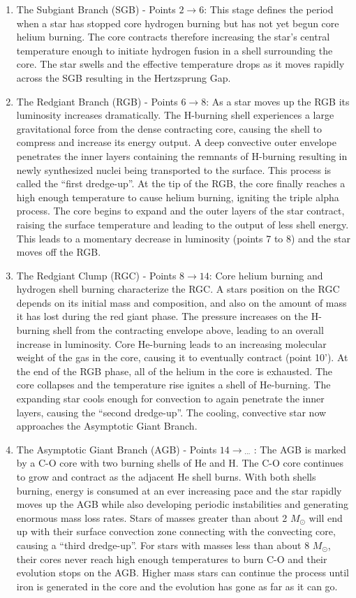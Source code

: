 \begin{enumerate}
%
\item The Subgiant Branch (SGB) - Points $2 \rightarrow 6$: This stage defines the period when a star has stopped core hydrogen burning but has not yet begun core helium burning. The core contracts therefore increasing the star's central temperature enough to initiate hydrogen fusion in a shell surrounding the core. The star swells and the effective temperature drops as it moves rapidly across the SGB resulting in the Hertzsprung Gap.
%
\item The Redgiant Branch (RGB) - Points $6 \rightarrow 8$: As a star moves up the RGB its luminosity increases dramatically. The H-burning shell experiences a large gravitational force from the dense contracting core, causing the shell to compress and increase its energy output. A deep convective outer envelope penetrates the inner layers containing the remnants of H-burning resulting in newly synthesized nuclei being transported to the surface. This process is called the ``first dredge-up''. At the tip of the RGB, the core finally reaches a high enough temperature to cause helium burning, igniting the triple alpha process. The core begins to expand and the outer layers of the star contract, raising the surface temperature and leading to the output of less shell energy. This leads to a momentary decrease in luminosity (points 7 to 8) and the star moves off the RGB.
%
\item The Redgiant Clump (RGC) - Points $8 \rightarrow 14$: Core helium burning and hydrogen shell burning characterize the RGC. A stars position on the RGC depends on its initial mass and composition, and  also on the amount of mass it has lost during the red giant phase. The pressure increases on the H-burning shell from the contracting envelope above, leading to an overall increase in luminosity. Core He-burning leads to an increasing molecular weight of the gas in the core, causing it to eventually contract (point 10'). At the end of the RGB phase, all of the helium in the core is exhausted. The core collapses and the temperature rise ignites a shell of He-burning. The expanding star cools enough for convection to again penetrate the inner layers, causing the ``second dredge-up''. The cooling, convective star  now approaches the Asymptotic Giant Branch.
%
\item The Asymptotic Giant Branch  (AGB) - Points $14 \rightarrow {}_{\cdots}$ : The AGB is marked by a C-O core with two burning shells of He and H. The C-O core continues to grow and contract as the adjacent He shell burns. With both shells burning, energy is consumed at an ever increasing pace and the star rapidly moves up the AGB while also developing periodic instabilities and generating enormous mass loss rates. Stars of masses greater than about 2 $M_{\odot}$ will end up with their surface convection zone connecting with the convecting core, causing a ``third dredge-up''. For stars with masses less than about 8 $M_{\odot}$, their cores never reach high enough temperatures to burn C-O and their evolution stops on the AGB. Higher mass stars can continue the process until iron is generated in the core and the evolution has gone as far as it can go.
%
\end{enumerate}


